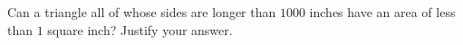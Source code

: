 Can a triangle all of whose sides are longer than $1000$ inches have an area of less than $1$ square inch? Justify your answer.
